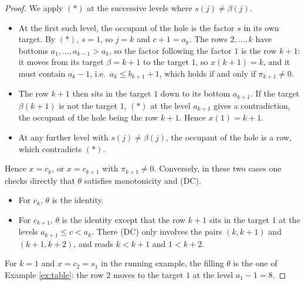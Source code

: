 \documentclass[a4paper,12pt,leqno]{amsart}
\theoremstyle{plain}
\theoremstyle{definition}
\theoremstyle{definition}
\begin{document}
\begin{proof}
We apply $(*)$ at the successive levels where $s(j)\neq\beta(j)$.
\begin{itemize}
\item At the first such level, the occupant of the hole is the factor $s$ in its own target. By $(*)$,
$s=1$, so $j=k$ and $c+1=a_k$. The rows $2,\ldots,k$ have bottoms $a_1,\ldots,a_{k-1}>a_k$, so the
factor following the factor $1$ is the row $k+1$: it moves from its target $\beta=k+1$ to the target
$1$, so $x(k+1)=k$, and it must contain $a_k-1$, i.e.\ $a_k\leq b_{k+1}+1$, which holds if and only if
$\pi_{k+1}\neq0$.
\item The row $k+1$ then sits in the target $1$ down to its bottom $a_{k+1}$. If the target
$\beta(k+1)$ is not the target $1$, $(*)$ at the level $a_{k+1}$ gives a contradiction, the occupant of
the hole being the row $k+1$. Hence $x(1)=k+1$.
\item At any further level with $s(j)\neq\beta(j)$, the occupant of the hole is a row, which contradicts
$(*)$.
\end{itemize}
Hence $x=c_k$, or $x=c_{k+1}$ with $\pi_{k+1}\neq0$. Conversely, in these two cases one checks
directly that $\theta$ satisfies monotonicity and (DC).
\begin{itemize}
\item For $c_k$, $\theta$ is the identity.
\item For $c_{k+1}$, $\theta$ is the identity except that the row $k+1$ sits in the target $1$ at
the levels $a_{k+1}\leq c<a_k$. There (DC) only involves the pairs $(k,k+1)$ and $(k+1,k+2)$, and
reads $k<k+1$ and $1<k+2$.
\end{itemize}
For $k=1$ and $x=c_2=s_1$ in the running example, the filling $\theta$ is the one of Example
\ref{ex:table}: the row $2$ moves to the target $1$ at the level $a_1-1=8$.
\end{proof}
\end{document}
